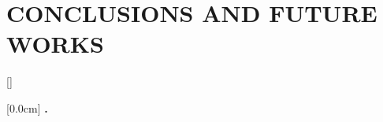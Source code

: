 \documentclass[a4paper,13pt,3p,oneside]{report}
\theoremstyle{definition}
\begin{document}
\newpage
\chapter{CONCLUSIONS AND FUTURE WORKS}
\label{chapter:conclusion}


\newpage


\newpage
\renewcommand\bibname{REFERENCE}
\printbibliography
{}


[]
\titlespacing*{\chapter}{0pt}{-20pt}{20pt}

    [0.0cm]             %
    {\bfseries\vspace{0.3cm}}                  %
    {{\bfseries{\scshape} \thecontentslabel.\ }} %
    {}         %
    {\contentspage} 
    
% 

% 
\end{document}
